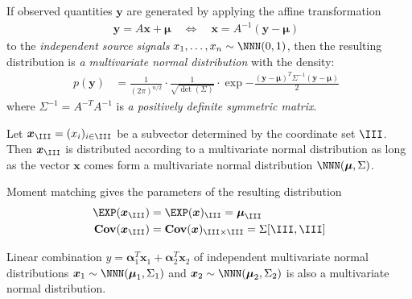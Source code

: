 \documentclass[landscape,footrule]{foils}
\renewcommand{\vec}[1]{\boldsymbol{#1}}
\newcommand{\COV}{\mathbf{Cov}}
\begin{document}

If observed quantities $\vec{y}$ are generated by applying the affine transformation 
\begin{align*}
 \vec{y}=A\vec{x}+\vec{\mu}\quad\Leftrightarrow\quad \vec{x}=A^{-1}(\vec{y}-\vec{\mu})\enspace
\end{align*}
to the \emph{independent source signals} $x_1,\ldots, x_n\sim\NNN(0,1)$, then the resulting distribution is \emph{a multivariate normal distribution} with the density:
\begin{align*}
p(\vec{y})&=\frac{1}{(2\pi)^{n/2}}\cdot\frac{1}{\sqrt{\det(\Sigma)}}\cdot
\exp{-\frac{(\vec{y}-\vec{\mu})^T \Sigma^{-1}(\vec{y}-\vec{\mu})}{2}}\enspace
\end{align*} 
where $\Sigma^{-1}=A^{-T}A^{-1}$ is \emph{a positively definite symmetric matrix}.





Let $\vec{x}_{\III}=(x_i)_{i\in\III}$ be a subvector determined by the coordinate set $\III$.
Then $\vec{x}_{\III}$ is distributed according to a multivariate normal distribution as long as 
the vector $\vec{x}$ comes form a multivariate normal distribution $\NNN(\vec{\mu},\Sigma)$.

\begin{triangles}
\item Moment matching gives the parameters of the resulting distribution 
\begin{align*}
\EXP(\vec{x}_{\III})&= \EXP(\vec{x})_{\III}=\vec{\mu}_{\III} \\
\COV(\vec{x}_{\III})&=\COV(\vec{x})_{\III\times \III}=\Sigma[\III, \III]
\end{align*}
\end{triangles}


Linear combination $y=\vec{\alpha}_1^T \vec{x}_1+\vec{\alpha}_2^T\vec{x}_2$ of independent multivariate normal distributions $\vec{x}_1\sim\NNN(\vec{\mu}_1,\Sigma_1)$ and $\vec{x}_2\sim\NNN(\vec{\mu}_2,\Sigma_2)$ is also  a multivariate normal distribution.
\end{document}
